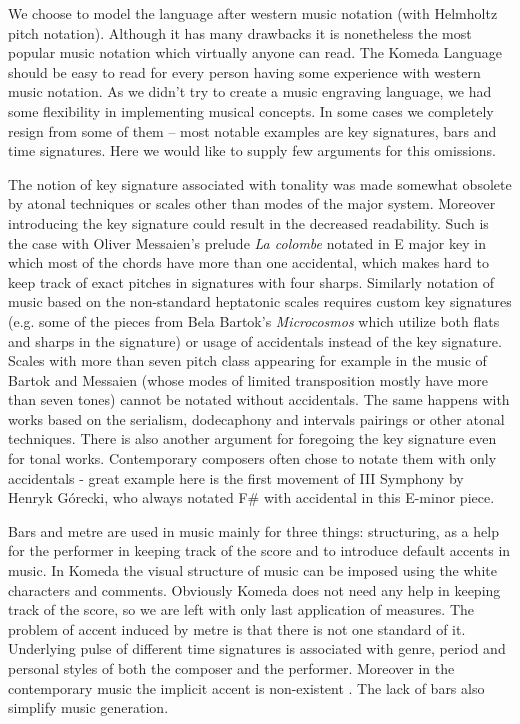 \documentclass{article}
\begin{document}
We choose to model the language after western music notation (with Helmholtz pitch notation).
Although it has many drawbacks it is nonetheless the most popular
music notation which virtually anyone can read. The Komeda Language should be
easy to read for every person having some experience with western music notation.
As we didn't try to create a music engraving language, we had some flexibility in
implementing musical concepts. In some cases we completely resign from some of
them -- most notable examples are key signatures, bars and time signatures.
Here we would like to supply few arguments for this omissions.

The notion of key signature associated with tonality was made somewhat obsolete
by atonal techniques or scales other than modes of the major system. Moreover
introducing the key signature could result in the decreased readability. Such
is the case with Oliver Messaien's prelude {\it La colombe} notated in E major
key in which most of the chords have more than one accidental, which makes hard
to keep track of exact pitches in signatures with four sharps.  Similarly
notation of music based on the non-standard heptatonic scales requires custom
key signatures (e.g. some of the pieces from Bela Bartok's {\it Microcosmos}
which utilize both flats and sharps in the signature) or usage of accidentals
instead of the key signature.  Scales with more than seven pitch class
appearing for example  in the music of Bartok \cite{bela1} \cite{bela2} and
Messaien (whose modes of limited transposition \cite{mess} mostly have more
than seven tones) cannot be notated without accidentals. The same happens with
works based on the serialism, dodecaphony and intervals pairings \cite{lutos}
or other atonal techniques. There is also another argument for foregoing the
key signature even for tonal works. Contemporary composers often chose to
notate them with only accidentals - great example here is the first movement of
III Symphony by Henryk G\'{o}recki, who always notated F\# with accidental in
this E-minor piece.

Bars and metre are used in music mainly for three things: structuring, as a
help for the performer in keeping track of the score and to introduce default
accents in music. In Komeda the visual structure of music can be imposed using
the white characters and comments. Obviously Komeda does not need any help in
keeping track of the score, so we are left with only last application of
measures. The problem of accent induced by metre is that there is not one
standard of it. Underlying pulse of different time signatures is associated
with genre, period and personal styles of both the composer and the performer.
Moreover in the contemporary music the implicit accent is non-existent
\cite{harm}. The lack of bars also simplify music generation.
\end{document}
